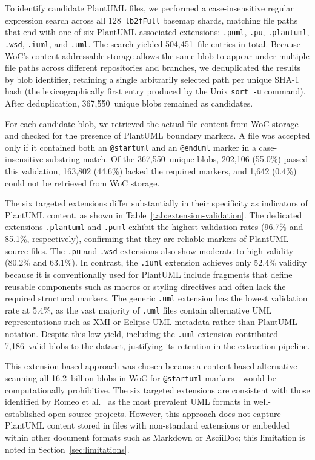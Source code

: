 \documentclass[data,datadescriptor,submit,pdftex,moreauthors]{Definitions/mdpi}
\begin{document}
To identify candidate PlantUML files, we performed a case-insensitive regular expression search across all 128~\texttt{lb2fFull} basemap shards, matching file paths that end with one of six PlantUML-associated extensions: \texttt{.puml}, \texttt{.pu}, \texttt{.plantuml}, \texttt{.wsd}, \texttt{.iuml}, and \texttt{.uml}. The search yielded 504,451~file entries in total. Because WoC's content-addressable storage allows the same blob to appear under multiple file paths across different repositories and branches, we deduplicated the results by blob identifier, retaining a single arbitrarily selected path per unique SHA-1 hash (the lexicographically first entry produced by the Unix \texttt{sort~-u} command). After deduplication, 367,550~unique blobs remained as candidates.

For each candidate blob, we retrieved the actual file content from WoC storage and checked for the presence of PlantUML boundary markers. A file was accepted only if it contained both an \texttt{@startuml} and an \texttt{@enduml} marker in a case-insensitive substring match. Of the 367,550~unique blobs, 202,106 (55.0\%) passed this validation, 163,802 (44.6\%) lacked the required markers, and 1,642 (0.4\%) could not be retrieved from WoC storage.

The six targeted extensions differ substantially in their specificity as indicators of PlantUML content, as shown in Table~\ref{tab:extension-validation}. The dedicated extensions \texttt{.plantuml} and \texttt{.puml} exhibit the highest validation rates (96.7\% and 85.1\%, respectively), confirming that they are reliable markers of PlantUML source files. The \texttt{.pu} and \texttt{.wsd} extensions also show moderate-to-high validity (80.2\% and 63.1\%). In contrast, the \texttt{.iuml} extension achieves only 52.4\% validity because it is conventionally used for PlantUML include fragments that define reusable components such as macros or styling directives and often lack the required structural markers. The generic \texttt{.uml} extension has the lowest validation rate at 5.4\%, as the vast majority of \texttt{.uml} files contain alternative UML representations such as XMI or Eclipse UML metadata rather than PlantUML notation. Despite this low yield, including the \texttt{.uml} extension contributed 7,186~valid blobs to the dataset, justifying its retention in the extraction pipeline.

This extension-based approach was chosen because a content-based alternative---scanning all 16.2~billion blobs in WoC for \texttt{@startuml} markers---would be computationally prohibitive. The six targeted extensions are consistent with those identified by Romeo et al.~\cite{romeo2025uml} as the most prevalent UML formats in well-established open-source projects. However, this approach does not capture PlantUML content stored in files with non-standard extensions or embedded within other document formats such as Markdown or AsciiDoc; this limitation is noted in Section~\ref{sec:limitations}.
\end{document}
